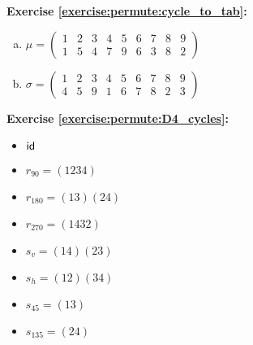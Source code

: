 \noindent\textbf{Exercise \ref{exercise:permute:cycle_to_tab}:}
\begin{multicols}{2}
\begin{enumerate}[(a)]
\item
$\mu = \begin{pmatrix}
1 & 2 & 3 & 4 & 5 & 6 & 7 & 8 & 9\\
1 & 5 & 4 & 7 & 9 & 6 & 3 & 8 & 2
\end{pmatrix}$

\item
$\sigma = \begin{pmatrix}
1 & 2 & 3 & 4 & 5 & 6 & 7 & 8 & 9\\
4 & 5 & 9 & 1 & 6 & 7 & 8 & 2 & 3
\end{pmatrix}$
\end{enumerate}
\end{multicols}

\noindent\textbf{Exercise \ref{exercise:permute:D4_cycles}:}
\begin{multicols}{3}
\begin{itemize}
\item
$\sf{id}$

\item
$r_{90} = (1234)$

\item
$r_{180} = (13)(24)$

\item
$r_{270} = (1432)$

\item
$s_v = (14)(23)$

\item
$s_h = (12)(34)$

\item
$s_{45} = (13)$

\item
$s_{135} = (24)$
\end{itemize}
\end{multicols}

